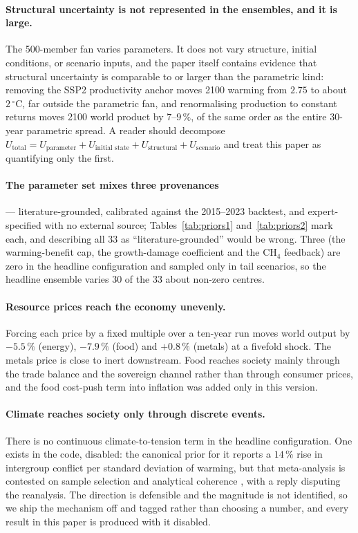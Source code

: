 \documentclass[12pt,a4paper]{article}
\newcommand{\degC}{$^{\circ}$C}
\begin{document}
\paragraph{Structural uncertainty is not represented in the ensembles, and it is large.} The
500-member fan varies parameters. It does not vary structure, initial conditions, or scenario
inputs, and the paper itself contains evidence that structural uncertainty is comparable to or
larger than the parametric kind: removing the SSP2 productivity anchor moves 2100 warming from
$2.75$ to about $2$\,\degC, far outside the parametric fan, and renormalising production to
constant returns moves 2100 world product by $7$--$9\,\%$, of the same order as the entire
30-year parametric spread. A reader should decompose $U_{\text{total}} = U_{\text{parameter}} +
U_{\text{initial state}} + U_{\text{structural}} + U_{\text{scenario}}$ and treat this paper as
quantifying only the first.

\paragraph{The parameter set mixes three provenances} --- literature-grounded, calibrated
against the 2015--2023 backtest, and expert-specified with no external source;
Tables~\ref{tab:priors1} and~\ref{tab:priors2} mark each, and describing all 33 as
``literature-grounded'' would be wrong. Three (the warming-benefit cap, the growth-damage
coefficient and the CH$_4$ feedback) are zero in the headline configuration and sampled only in
tail scenarios, so the headline ensemble varies 30 of the 33 about non-zero centres.

\paragraph{Resource prices reach the economy unevenly.} Forcing each price by a fixed multiple
over a ten-year run moves world output by $-5.5\,\%$ (energy), $-7.9\,\%$ (food) and $+0.8\,\%$
(metals) at a fivefold shock. The metals price is close to inert downstream. Food reaches
society mainly through the trade balance and the sovereign channel rather than through consumer
prices, and the food cost-push term into inflation was added only in this version.

\paragraph{Climate reaches society only through discrete events.} There is no continuous
climate-to-tension term in the headline configuration. One exists in the code, disabled: the
canonical prior for it \citep{hsiang2013} reports a $14\,\%$ rise in intergroup conflict per
standard deviation of warming, but that meta-analysis is contested on sample selection and
analytical coherence \citep{buhaug2014}, with a reply disputing the reanalysis. The direction is
defensible and the magnitude is not identified, so we ship the mechanism off and tagged rather
than choosing a number, and every result in this paper is produced with it disabled.
\end{document}
